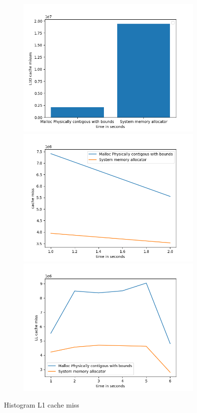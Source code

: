 \begin{figure}
  \begin{subfigure}{\linewidth}
    \includegraphics[width=.5\linewidth]{BenchmarkRuns/histogram/ll_histogram_small.png}\hfill
    \includegraphics[width=.5\linewidth]{BenchmarkRuns/histogram/ll_data_histogram_medium.png}\hfill
    \includegraphics[width=.5\linewidth]{BenchmarkRuns/histogram/ll_cache_histogram_large.png}
  \caption{}
  \end{subfigure}
  \caption{Histogram L1 cache miss}
\end{figure}